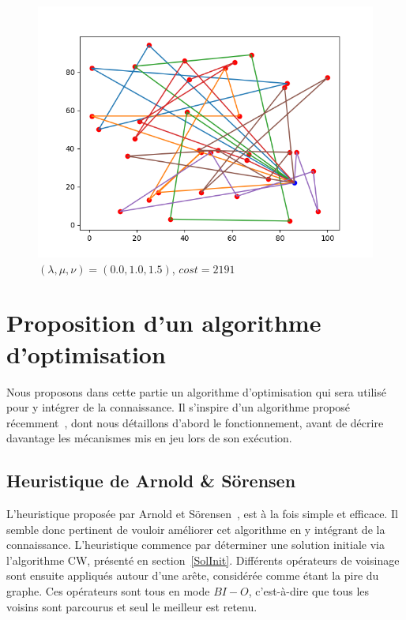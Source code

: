 \documentclass[a4paper,11pt]{article}%
\begin{document}
\begin{figure}
\begin{minipage}[c]{.42\linewidth}
	\caption{$(\lambda, \mu, \nu)=(0.1,0.1,0.1)$, $cost = 1569$}
	\label{resCW111}
    \end{minipage}
    
    
        \centering
	\includegraphics[scale=0.4]{resCW001015.png}
 	\caption{$(\lambda, \mu, \nu)=(0.0,1.0,1.5)$, $cost = 2191$}
 	\label{resCW001015}
    
\end{figure}

\section{Proposition d'un algorithme d'optimisation}
\label{opti}
Nous proposons dans cette partie un algorithme d'optimisation qui sera utilisé pour y intégrer de la connaissance. Il s'inspire d'un algorithme proposé récemment~\cite{Sorensen_2017}, dont nous détaillons d'abord le fonctionnement, avant de décrire davantage les mécanismes mis en jeu lors de son exécution.

\subsection{Heuristique de Arnold \& Sörensen}
L'heuristique proposée par Arnold et Sörensen~\cite{Sorensen_2017}, est à la fois simple et efficace. 
Il semble donc pertinent de vouloir améliorer cet algorithme en y intégrant de la connaissance.
L'heuristique commence par déterminer une solution initiale via l'algorithme CW, présenté en section~\ref{SolInit}. Différents opérateurs de voisinage sont ensuite appliqués autour d'une arête, considérée comme étant la pire du graphe. Ces opérateurs sont tous en mode $BI-O$, c'est-à-dire que tous les voisins sont parcourus et seul le meilleur est retenu.
\end{document}
